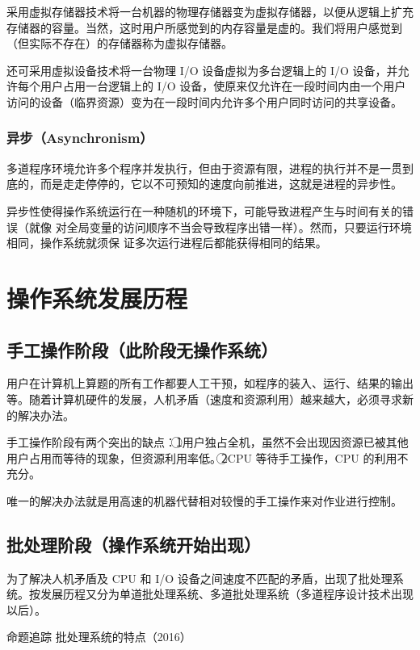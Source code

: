 \documentclass{ctexbook}
\begin{document}
	采用虚拟存储器技术将一台机器的物理存储器变为虚拟存储器，以便从逻辑上扩充存储器的容量。当然，这时用户所感觉到的内存容量是虚的。我们将用户感觉到（但实际不存在）的存储器称为虚拟存储器。
	
	还可采用虚拟设备技术将一台物理 I/O 设备虚拟为多台逻辑上的 I/O 设备，并允许每个用户占用一台逻辑上的 I/O 设备，使原来仅允许在一段时间内由一个用户访问的设备（临界资源）变为在一段时间内允许多个用户同时访问的共享设备。
	
	\subsubsection{异步（Asynchronism）}
	多道程序环境允许多个程序并发执行，但由于资源有限，进程的执行并不是一贯到底的，而是走走停停的，它以不可预知的速度向前推进，这就是进程的异步性。
	
	异步性使得操作系统运行在一种随机的环境下，可能导致进程产生与时间有关的错误（就像
	对全局变量的访问顺序不当会导致程序出错一样）。然而，只要运行环境相同，操作系统就须保
	证多次运行进程后都能获得相同的结果。
	
	\section{操作系统发展历程}
	\subsection{手工操作阶段（此阶段无操作系统）}
	用户在计算机上算题的所有工作都要人工干预，如程序的装入、运行、结果的输出等。随着计算机硬件的发展，人机矛盾（速度和资源利用）越来越大，必须寻求新的解决办法。
	
	手工操作阶段有两个突出的缺点：\textcircled{1}用户独占全机，虽然不会出现因资源已被其他用户占用而等待的现象，但资源利用率低。\textcircled{2}CPU 等待手工操作，CPU 的利用不充分。
	
	唯一的解决办法就是用高速的机器代替相对较慢的手工操作来对作业进行控制。
	
	\subsection{批处理阶段（操作系统开始出现）}
	为了解决人机矛盾及 CPU 和 I/O 设备之间速度不匹配的矛盾，出现了批处理系统。按发展历程又分为单道批处理系统、多道批处理系统（多道程序设计技术出现以后）。

	\colorbox{gray!20}{命题追踪 \enspace 批处理系统的特点（2016）}
\end{document}
